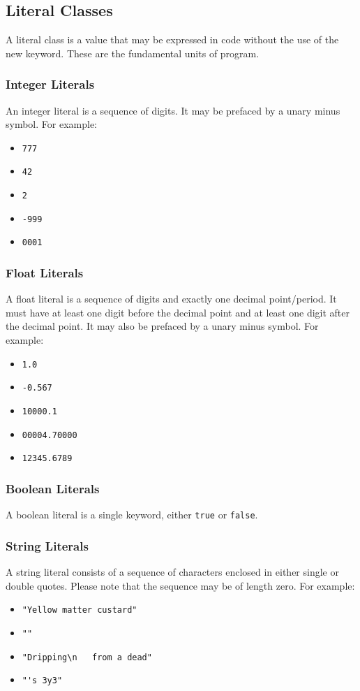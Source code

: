 \subsection{Literal Classes}
A literal class is a value that may be expressed in code without the use of the new keyword. These are the fundamental units of program.

\subsubsection{Integer Literals}
An integer literal is a sequence of digits. It may be prefaced by a unary minus symbol. For example:
\begin{itemize}
\item \verb!777!
\item \verb!42!
\item \verb!2!
\item \verb!-999!
\item \verb!0001!
\end{itemize}

\subsubsection{Float Literals}
A float literal is a sequence of digits and exactly one decimal point/period. It must have at least one digit before the decimal point and at least one digit after the decimal point. It may also be prefaced by a unary minus symbol. For example:
\begin{itemize}
\item \verb!1.0!
\item \verb!-0.567!
\item \verb!10000.1!
\item \verb!00004.70000!
\item \verb!12345.6789!
\end{itemize}

\subsubsection{Boolean Literals}
A boolean literal is a single keyword, either \verb!true! or \verb!false!.

\subsubsection{String Literals}
A string literal consists of a sequence of characters enclosed in either single or double quotes. Please note that the sequence may be of length zero. For example:
\begin{itemize}
\item \verb!"Yellow matter custard"!
\item \verb!""!
\item \verb!"Dripping\n   from a dead"!
\item \verb!"'s 3y3"!
\end{itemize}

